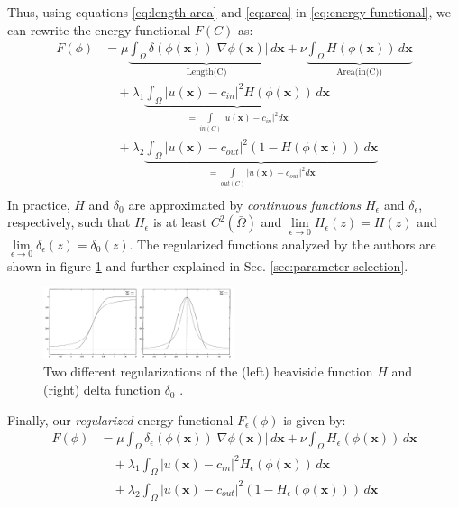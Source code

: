 \documentclass[journal]{IEEEtran}
\begin{document}
Thus, using equations \ref{eq:length-area} and \eqref{eq:area} in \eqref{eq:energy-functional}, we can rewrite the energy functional $F(C)$ as:
\begin{align*}
    F(\phi)
     & = \mu \underbrace{\int_{\Omega} \delta(\phi(\bm{x})) |\nabla \phi(\bm{x})| \, d\bm{x}}_{\textrm{Length(C)}} + \nu \underbrace{\int_{\Omega} H(\phi(\bm{x})) \, d\bm{x}}_{\textrm{Area(in(C))}}      \\
     & \quad + \lambda_1 \underbrace{\int_{\Omega} |u(\bm{x}) - c_{in}|^2 H(\phi(\bm{x})) \, d\bm{x}}_{\text{$= $$\int\limits_{\scriptstyle in(C)} \left| u(\bm{x}) - c_{in} \right|^2 d\bm{x}$}}          \\
     & \quad + \lambda_2 \underbrace{\int_{\Omega} |u(\bm{x}) - c_{out}|^2 (1 - H(\phi(\bm{x}))) \, d\bm{x}}_{\text{$= $$\int\limits_{\scriptstyle out(C)} \left| u(\bm{x}) - c_{out} \right|^2 d\bm{x}$}} \\
\end{align*}
In practice, $H$ and $\delta_0$ are approximated by \emph{continuous functions} $H_{\epsilon}$ and $\delta_{\epsilon}$, respectively, such that $H_\epsilon$ is at least $C^2(\bar{\Omega})$ and $\lim\limits_{\epsilon \to 0} H_{\epsilon}(z) = H(z)$ and $\lim\limits_{\epsilon \to 0} \delta_{\epsilon}(z) = \delta_0(z)$. The regularized functions analyzed by the authors are shown in figure \ref{fig:heaviside-regularized} and further explained in Sec. \ref{sec:parameter-selection}.

\begin{figure}[!t]
    \centering
    \includegraphics[width=0.5\textwidth]{images/heaviside-regularized.png}
    \caption{Two different regularizations of the (left) heaviside function $H$ and (right) delta function $\delta_0$ \cite{ChanVese}.}
    \label{fig:heaviside-regularized}
\end{figure}

Finally, our \emph{regularized} energy functional $F_\epsilon(\phi)$ is given by:
\begin{align*}
    F(\phi)
     & = \mu \int_{\Omega} \delta_\epsilon(\phi(\bm{x})) |\nabla \phi(\bm{x})| \, d\bm{x} + \nu \int_{\Omega} H_\epsilon(\phi(\bm{x})) \, d\bm{x} \\
     & \quad + \lambda_1 \int_{\Omega} |u(\bm{x}) - c_{in}|^2 H_\epsilon(\phi(\bm{x})) \, d\bm{x}                                                 \\
     & \quad + \lambda_2 \int_{\Omega} |u(\bm{x}) - c_{out}|^2 (1 - H_\epsilon(\phi(\bm{x}))) \, d\bm{x}                                          \\
\end{align*}
\end{document}

